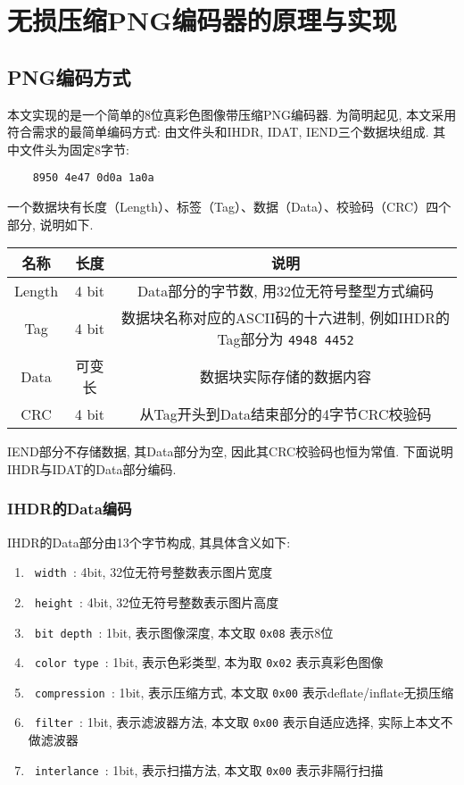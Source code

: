 \documentclass[UTF8]{ctexart}
\begin{document}
\section{无损压缩PNG编码器的原理与实现}

\subsection{PNG编码方式}

本文实现的是一个简单的8位真彩色图像带压缩PNG编码器. 为简明起见, 本文采用符合需求的最简单编码方式: 由文件头和IHDR, IDAT, IEND三个数据块组成. 其中文件头为固定8字节: 

\begin{verbatim}
    8950 4e47 0d0a 1a0a
\end{verbatim}

一个数据块有长度（Length）、标签（Tag）、数据（Data）、校验码（CRC）四个部分, 说明如下.

\begin{table}[H]
    \centering
    \begin{tabular}{|c|c|c|}
        \hline
        \textbf{名称} & \textbf{长度} & \textbf{说明} \\ \hline
        Length & 4 bit & Data部分的字节数, 用32位无符号整型方式编码 \\ \hline
        Tag & 4 bit & 数据块名称对应的ASCII码的十六进制, 例如IHDR的Tag部分为 \verb |4948 4452| \\ \hline
        Data & 可变长 & 数据块实际存储的数据内容 \\ \hline
        CRC & 4 bit & 从Tag开头到Data结束部分的4字节CRC校验码 \\ \hline
    \end{tabular}
\end{table}

IEND部分不存储数据, 其Data部分为空, 因此其CRC校验码也恒为常值. 下面说明IHDR与IDAT的Data部分编码.

\subsubsection{IHDR的Data编码}

IHDR的Data部分由13个字节构成, 其具体含义如下: 

\begin{enumerate}[itemindent=2em]
    \setlength{\itemsep}{-5pt}
    \item \verb| width |: 4bit, 32位无符号整数表示图片宽度
    \item \verb| height |: 4bit, 32位无符号整数表示图片高度
    \item \verb| bit depth |: 1bit, 表示图像深度, 本文取 \verb |0x08| 表示8位
    \item \verb| color type |: 1bit, 表示色彩类型, 本为取 \verb |0x02| 表示真彩色图像
    \item \verb| compression |: 1bit, 表示压缩方式, 本文取 \verb |0x00| 表示deflate/inflate无损压缩
    \item \verb| filter |: 1bit, 表示滤波器方法, 本文取 \verb |0x00| 表示自适应选择, 实际上本文不做滤波器
    \item \verb| interlance |: 1bit, 表示扫描方法, 本文取 \verb |0x00| 表示非隔行扫描
\end{enumerate}
\end{document}
